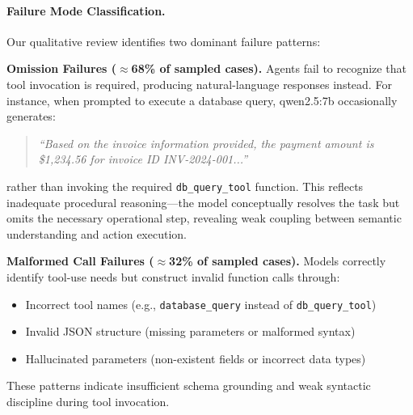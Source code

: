 \documentclass[conference]{IEEEtran}
\begin{document}

\paragraph{Failure Mode Classification.}
Our qualitative review identifies two dominant failure patterns:

\textbf{Omission Failures ($\approx$68\% of sampled cases).} Agents fail to recognize that tool invocation is required, producing natural-language responses instead. For instance, when prompted to execute a database query, qwen2.5:7b occasionally generates:
    
    \begin{quote}
    \textit{``Based on the invoice information provided, the payment amount is \$1,234.56 for invoice ID INV-2024-001...''}
    \end{quote}
    
    rather than invoking the required \texttt{db\_query\_tool} function. This reflects inadequate procedural reasoning—the model conceptually resolves the task but omits the necessary operational step, revealing weak coupling between semantic understanding and action execution.
    
\textbf{Malformed Call Failures ($\approx$32\% of sampled cases).} Models correctly identify tool-use needs but construct invalid function calls through:
    \begin{itemize}
        \item Incorrect tool names (e.g., \texttt{database\_query} instead of \texttt{db\_query\_tool})
        \item Invalid JSON structure (missing parameters or malformed syntax)
        \item Hallucinated parameters (non-existent fields or incorrect data types)
    \end{itemize}
    These patterns indicate insufficient schema grounding and weak syntactic discipline during tool invocation.
\end{document}
